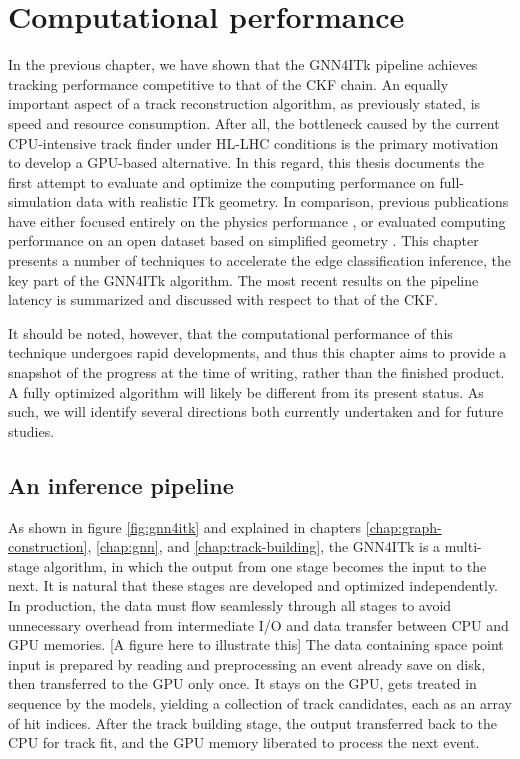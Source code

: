 \chapter{Computational performance}
\label{chap:computing-performace}

In the previous chapter, we have shown that the GNN4ITk pipeline achieves tracking performance competitive to that of the CKF chain. 
An equally important aspect of a track reconstruction algorithm, as previously stated, is speed and resource consumption.
After all, the bottleneck caused by the current CPU-intensive track finder under HL-LHC conditions is the primary motivation to develop a GPU-based alternative.
In this regard, this thesis documents the first attempt to evaluate and optimize the computing performance on full-simulation data with realistic ITk geometry. 
In comparison, previous publications have either focused entirely on the physics performance \cite{Burleson:2882507, ctd23-gnn4itk}, or evaluated computing performance on an open dataset based on simplified geometry \cite{exatrkx}. 
This chapter presents a number of techniques to accelerate the edge classification inference, the key part of the GNN4ITk algorithm. 
The most recent results on the pipeline latency is summarized and discussed with respect to that of the CKF. 

It should be noted, however, that the computational performance of this technique undergoes rapid developments, and thus this chapter aims to provide a snapshot of the progress at the time of writing, rather than the finished product.
A fully optimized algorithm will likely be different from its present status. 
As such, we will identify several directions both currently undertaken and for future studies.

\section{An inference pipeline}
As shown in figure \ref{fig:gnn4itk} and explained in chapters \ref{chap:graph-construction}, \ref{chap:gnn}, and \ref{chap:track-building}, the GNN4ITk is a multi-stage algorithm, in which the output from one stage becomes the input to the next.
It is natural that these stages are developed and optimized independently.
In production, the data must flow seamlessly through all stages to avoid unnecessary overhead from intermediate I/O and data transfer between CPU and GPU memories. 
[A figure here to illustrate this]
The data containing space point input is prepared by reading and preprocessing an event already save on disk, then transferred to the GPU only once. 
It stays on the GPU, gets treated in sequence by the models, yielding a collection of track candidates, each as an array of hit indices. 
After the track building stage, the output transferred back to the CPU for track fit, and the GPU memory liberated to process the next event. 

